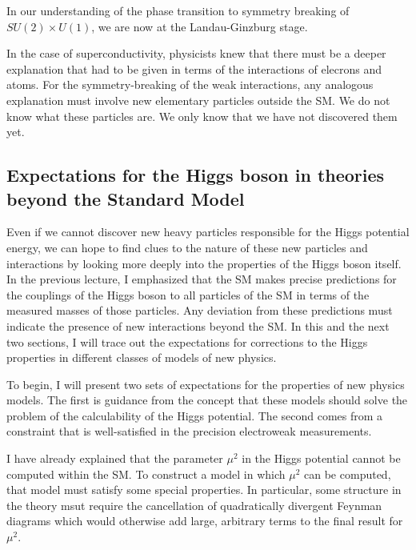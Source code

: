 \documentclass[12pt]{article}
\begin{document}
In our understanding of the phase transition to symmetry breaking of
$SU(2)\times U(1)$, we are now at the Landau-Ginzburg stage.

In the case of superconductivity, physicists knew that there must be a
deeper explanation that had to be given in terms of the interactions
of elecrons and atoms.   For the symmetry-breaking of the weak
interactions, any analogous explanation must involve new elementary
particles outside the SM.  We do not know what these
particles are.  We only know that we have not discovered them yet.




\subsection{Expectations for the Higgs boson in theories 
beyond the
  Standard
Model}


Even if we cannot discover new heavy particles responsible for the
Higgs potential energy, we can hope to find clues to the nature of
these new particles and interactions by looking more deeply into the
properties of the Higgs boson itself.   In the previous lecture, I
emphasized that the SM makes precise predictions for the couplings
of the Higgs boson to all particles of the SM in terms of
the measured masses of those particles.  Any deviation from these
predictions must indicate the presence of new interactions beyond the
SM.  In this and the next two sections, I will trace out the
expectations for corrections to the Higgs properties in different
classes of models of new physics.

To begin, I will present two sets of expectations for the properties
of new physics models.   The first is guidance from the concept that
these models should solve the problem of the calculability of the
Higgs potential.   The second comes from a constraint that is
well-satisfied in the precision electroweak measurements.

I have already explained that the parameter $\mu^2$ in the Higgs
potential cannot be computed within the SM.  To construct
a model in which $\mu^2$ can be computed, that model must satisfy some
special properties.   In particular, some structure in the theory msut
require the cancellation  of quadratically divergent Feynman diagrams
which would otherwise add large, arbitrary terms to the final result
for $\mu^2$.
\end{document}
